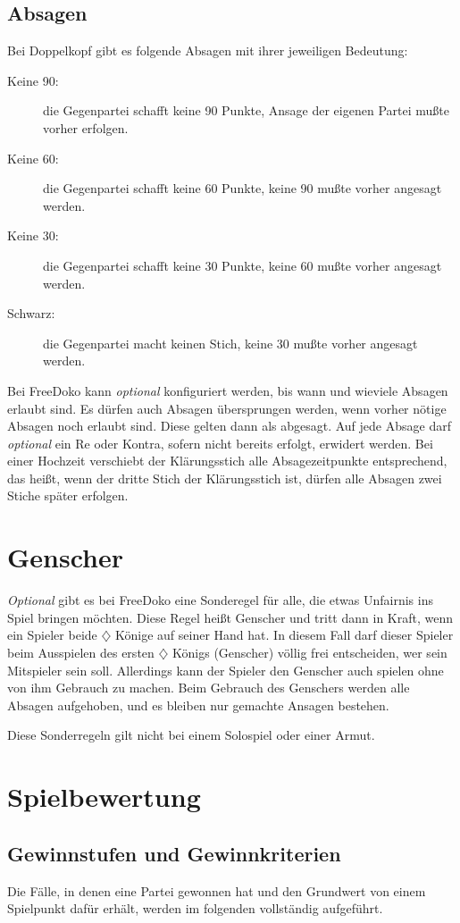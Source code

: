 \documentclass{scrartcl}
\newcommand{\karo}{$\diamondsuit$\xspace}
\newcommand{\optional}{\textit{optional}\xspace}
\newcommand{\Optional}{\textit{Optional}\xspace}
\begin{document}
\subsection{Absagen}
Bei Doppelkopf gibt es folgende Absagen mit ihrer jeweiligen Bedeutung:
\begin{description}
  \item[Keine 90:] die Gegenpartei schafft keine 90 Punkte, Ansage der eigenen Partei mußte vorher
    erfolgen.
  \item[Keine 60:] die Gegenpartei schafft keine 60 Punkte, keine 90 mußte vorher angesagt
    werden.
  \item[Keine 30:] die Gegenpartei schafft keine 30 Punkte, keine 60 mußte vorher angesagt
    werden.
  \item[Schwarz:] die Gegenpartei macht keinen Stich, keine 30 mußte vorher angesagt
    werden.
\end{description}
Bei FreeDoko kann \optional konfiguriert werden, bis wann und wieviele Absagen erlaubt sind. Es dürfen auch Absagen übersprungen werden, wenn vorher nötige Absagen noch erlaubt sind. Diese gelten dann als abgesagt. Auf jede Absage darf \optional ein Re oder Kontra, sofern nicht bereits erfolgt, erwidert werden. Bei einer Hochzeit verschiebt der Klärungsstich alle Absagezeitpunkte entsprechend, das heißt, wenn der dritte Stich der Klärungsstich ist, dürfen alle Absagen zwei Stiche später erfolgen.

\section{Genscher}
\Optional gibt es bei FreeDoko eine Sonderegel für alle, die etwas Unfairnis ins Spiel bringen möchten. Diese Regel heißt Genscher und tritt dann in Kraft, wenn ein Spieler beide \karo Könige auf seiner Hand hat. In diesem Fall darf dieser Spieler beim Ausspielen des ersten \karo Königs (Genscher) völlig frei entscheiden, wer sein Mitspieler sein soll. Allerdings kann der Spieler den Genscher auch spielen ohne von ihm Gebrauch zu machen.  Beim Gebrauch des Genschers werden alle Absagen aufgehoben, und es bleiben nur gemachte Ansagen bestehen.

Diese Sonderregeln gilt nicht bei einem Solospiel oder einer Armut.

\section{Spielbewertung}

\subsection{Gewinnstufen und Gewinnkriterien}
Die Fälle, in denen eine Partei gewonnen hat und den Grundwert von einem Spielpunkt dafür erhält, werden im folgenden vollständig aufgeführt.
\end{document}
